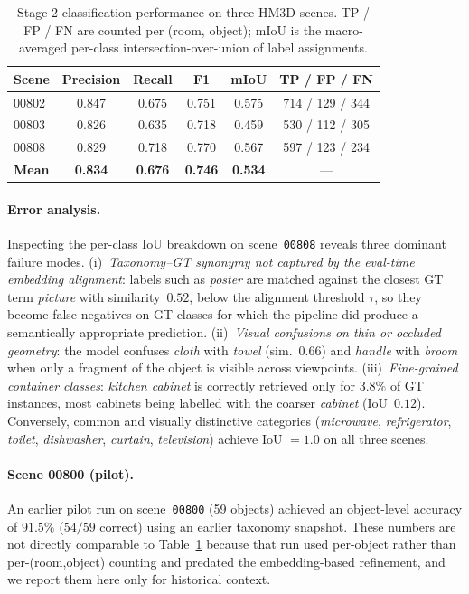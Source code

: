 \documentclass[conference]{IEEEtran}
\begin{document}
\begin{table}[t]
\centering
\caption{Stage-2 classification performance on three HM3D scenes.
TP / FP / FN are counted per (room, object); mIoU is the macro-averaged
per-class intersection-over-union of label assignments.}
\label{tab:hm3d}
\begin{tabular}{lccccc}
\toprule
Scene & Precision & Recall & F1 & mIoU & TP / FP / FN \\
\midrule
00802 & 0.847 & 0.675 & 0.751 & 0.575 & 714 / 129 / 344 \\
00803 & 0.826 & 0.635 & 0.718 & 0.459 & 530 / 112 / 305 \\
00808 & 0.829 & 0.718 & 0.770 & 0.567 & 597 / 123 / 234 \\
\midrule
\textbf{Mean} & \textbf{0.834} & \textbf{0.676} & \textbf{0.746} & \textbf{0.534} & --- \\
\bottomrule
\end{tabular}
\end{table}

\paragraph{Error analysis.}
Inspecting the per-class IoU breakdown on scene~\texttt{00808} reveals
three dominant failure modes. (i)~\emph{Taxonomy--GT synonymy not
captured by the eval-time embedding alignment}: labels such as
\emph{poster} are matched against the closest GT term \emph{picture}
with similarity~$0.52$, below the alignment threshold $\tau$, so they
become false negatives on GT classes for which the pipeline did
produce a semantically appropriate prediction. (ii)~\emph{Visual
confusions on thin or occluded geometry}: the model confuses
\emph{cloth} with \emph{towel} (sim.~$0.66$) and \emph{handle} with
\emph{broom} when only a fragment of the object is visible across
viewpoints. (iii)~\emph{Fine-grained container classes}: \emph{kitchen
cabinet} is correctly retrieved only for $3.8\%$ of GT instances, most
cabinets being labelled with the coarser \emph{cabinet} (IoU~$0.12$).
Conversely, common and visually distinctive categories
(\emph{microwave}, \emph{refrigerator}, \emph{toilet},
\emph{dishwasher}, \emph{curtain}, \emph{television}) achieve IoU $=
1.0$ on all three scenes.

\paragraph{Scene 00800 (pilot).}
An earlier pilot run on scene~\texttt{00800} (59 objects) achieved an
object-level accuracy of $91.5\%$ ($54/59$ correct) using an earlier
taxonomy snapshot. These numbers are not directly comparable to
Table~\ref{tab:hm3d} because that run used per-object rather than
per-(room,object) counting and predated the embedding-based refinement,
and we report them here only for historical context.
\end{document}

